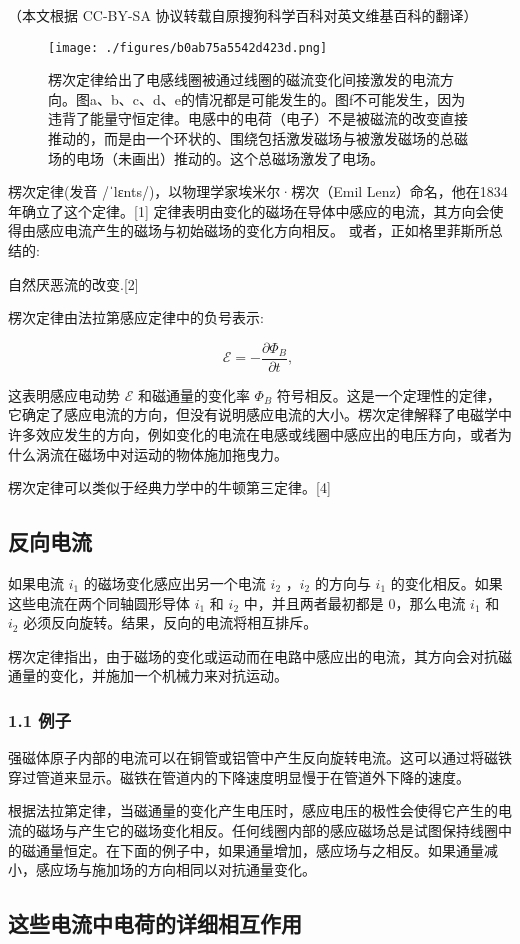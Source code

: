 
（本文根据 CC-BY-SA 协议转载自原搜狗科学百科对英文维基百科的翻译）

\begin{figure}[ht]
\centering
\texttt{[image: ./figures/b0ab75a5542d423d.png]}
\caption{楞次定律给出了电感线圈被通过线圈的磁流变化间接激发的电流方向。图a、b、c、d、e的情况都是可能发生的。图f不可能发生，因为违背了能量守恒定律。电感中的电荷（电子）不是被磁流的改变直接推动的，而是由一个环状的、围绕包括激发磁场与被激发磁场的总磁场的电场（未画出）推动的。这个总磁场激发了电场。} \label{fig_LCDL_1}
\end{figure}

楞次定律(发音 /ˈlɛnts/)，以物理学家埃米尔·楞次（Emil Lenz）命名，他在1834年确立了这个定律。[1] 定律表明由变化的磁场在导体中感应的电流，其方向会使得由感应电流产生的磁场与初始磁场的变化方向相反。 或者，正如格里菲斯所总结的:

自然厌恶流的改变.[2]

楞次定律由法拉第感应定律中的负号表示:

\begin{equation}
\mathcal{E} = -\frac{\partial \Phi_B}{\partial t},~
\end{equation}

这表明感应电动势 $\mathcal{E}$ 和磁通量的变化率 $\Phi_B$ 符号相反。这是一个定理性的定律，它确定了感应电流的方向，但没有说明感应电流的大小。楞次定律解释了电磁学中许多效应发生的方向，例如变化的电流在电感或线圈中感应出的电压方向，或者为什么涡流在磁场中对运动的物体施加拖曳力。

楞次定律可以类似于经典力学中的牛顿第三定律。[4]

\subsection{反向电流}

如果电流 $i_1$ 的磁场变化感应出另一个电流 $i_2$ ，$i_2$ 的方向与 $i_1$ 的变化相反。如果这些电流在两个同轴圆形导体 $i_1$ 和 $i_2$ 中，并且两者最初都是 0，那么电流 $i_1$ 和 $i_2$ 必须反向旋转。结果，反向的电流将相互排斥。

楞次定律指出，由于磁场的变化或运动而在电路中感应出的电流，其方向会对抗磁通量的变化，并施加一个机械力来对抗运动。

\subsubsection{1.1 例子}

强磁体原子内部的电流可以在铜管或铝管中产生反向旋转电流。这可以通过将磁铁穿过管道来显示。磁铁在管道内的下降速度明显慢于在管道外下降的速度。

根据法拉第定律，当磁通量的变化产生电压时，感应电压的极性会使得它产生的电流的磁场与产生它的磁场变化相反。任何线圈内部的感应磁场总是试图保持线圈中的磁通量恒定。在下面的例子中，如果通量增加，感应场与之相反。如果通量减小，感应场与施加场的方向相同以对抗通量变化。

\subsection{这些电流中电荷的详细相互作用}

